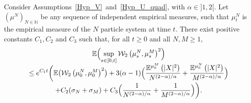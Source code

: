 \begin{lemma}
Consider Assumptions~\ref{Hyp_V}~and~\ref{Hyp_U_quad}, with $\alpha\in{}]1,2[$. Let $(\mu^N)_{N\in\mathbb{N}}$ be any sequence of independent empirical measures, such that $\mu_t^N$ is the empirical measure of the $N$ particle system at time $t$. There exist positive constants $C_1, C_2$ and $C_3$ such that, for all $t\geq0$ and all $N,M\geq 1$,\vspace*{-5pt}
\begin{multline}
\mathbb{E}\Bigl(\sup_{s\in[0,t]}\mathcal{W}_2\left(\mu_s^N,\mu_s^M\right)^2\Bigr)
\\[-5pt]
\leq e^{C_1 t}\biggl(\mathbb{E}\bigl(\mathcal{W}_2\left(\mu_0^N,\mu_0^M\right)^2\bigr)+3(\alpha-1)\Bigl(\frac{\mathbb{E}^{\mu_0^M}\left(|X|^2\right)}{N^{(2-\alpha)/\alpha}}+\frac{\mathbb{E}^{\mu_0^N}\left(|X|^2\right)}{M^{(2-\alpha)/\alpha}}\Bigr)\\[-3pt]
+C_2(\sigma_N+\sigma_M)+C_3\Bigl(\frac{1}{N^{(2-\alpha)/\alpha}}+\frac{1}{M^{(2-\alpha)/\alpha}}\Bigr)\biggr).\label{non_unif_avec_sup_2}
\end{multline}
\end{lemma}

